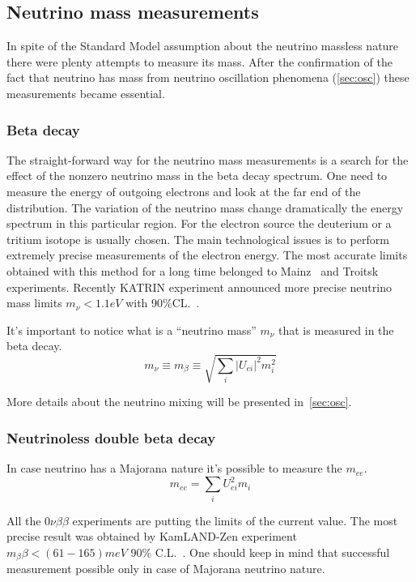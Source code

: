 \documentclass[../main.tex]{subfiles}
\begin{document}
\subsection{Neutrino mass measurements}
In spite of the Standard Model assumption about the neutrino massless nature there were plenty attempts to measure its mass. After the confirmation of the fact that neutrino has mass from neutrino oscillation phenomena (\autoref{sec:osc}) these measurements became essential.

\subsubsection{Beta decay}
The straight-forward way for the neutrino mass measurements is a search for the effect of the nonzero neutrino mass in the beta decay spectrum. One need to measure the energy of outgoing electrons and look at the far end of the distribution. The variation of the neutrino mass change dramatically the energy spectrum in this particular region. For the electron source the deuterium or a tritium isotope is usually chosen. The main technological issues is to perform extremely precise measurements of the electron energy. The most accurate limits obtained with this method for a long time belonged to Mainz~\cite{Kraus2005} and Troitsk~\cite{Aseev2011} experiments. Recently KATRIN experiment announced more precise neutrino mass limits $m_\nu < 1.1 eV$ with 90\%CL.~\cite{Aker2019}.

It's important to notice what is a ``neutrino mass'' $m_\nu$ that is measured in the beta decay.
\begin{equation}
m_\nu\equiv m_\beta\equiv\sqrt{\sum_i\left|U_{ei}\right|^2m_i^2}
\end{equation}

More details about the neutrino mixing will be presented in~\autoref{sec:osc}.

\subsubsection{Neutrinoless double beta decay}
In case neutrino has a Majorana nature it's possible to measure the $m_{ee}$.
\begin{equation}
m_{ee}=\sum_i U^2_{ei}m_i
\end{equation}

All the $0\nu\beta\beta$ experiments are putting the limits of the current value. The most precise result was obtained by KamLAND-Zen experiment $m_\beta\beta < (61-165) meV$ 90\% C.L.~\cite{Gando2016}. One should keep in mind that successful measurement possible only in case of Majorana neutrino nature.
\end{document}
